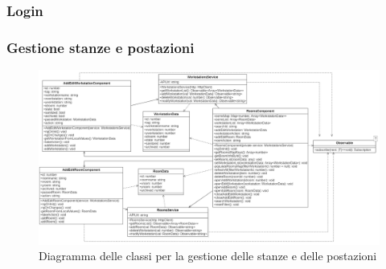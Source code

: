 \subsubsection{Login}
\subsubsection{Gestione stanze e postazioni}
\begin{figure}[H]
	\centering
	\includegraphics[width=18cm]{res/images/webapp-visualAddEditStanzePostazioni-diagrammaClassi.png}
	\caption{Diagramma delle classi per la gestione delle stanze e delle postazioni}
	\label{fig:DiagrammaClassiStanzePostazioni}
\end{figure}

